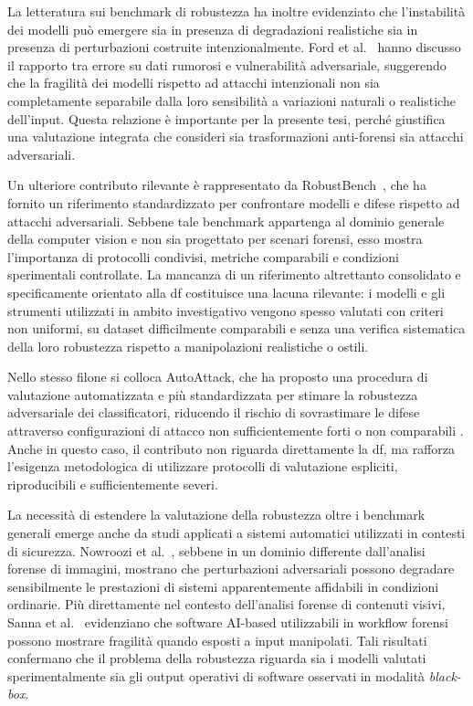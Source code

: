 La letteratura sui benchmark di robustezza ha inoltre evidenziato che l'instabilità dei modelli può emergere sia in presenza di degradazioni realistiche sia in presenza di perturbazioni costruite intenzionalmente. Ford et al.~\cite{ford2019adversarial} hanno discusso il rapporto tra errore su dati rumorosi e vulnerabilità adversariale, suggerendo che la fragilità dei modelli rispetto ad attacchi intenzionali non sia completamente separabile dalla loro sensibilità a variazioni naturali o realistiche dell'input. Questa relazione è importante per la presente tesi, perché giustifica una valutazione integrata che consideri sia trasformazioni anti-forensi sia attacchi adversariali.

Un ulteriore contributo rilevante è rappresentato da RobustBench~\cite{croce2020robustbench}, che ha fornito un riferimento standardizzato per confrontare modelli e difese rispetto ad attacchi adversariali. Sebbene tale benchmark appartenga al dominio generale della computer vision e non sia progettato per scenari forensi, esso mostra l'importanza di protocolli condivisi, metriche comparabili e condizioni sperimentali controllate. La mancanza di un riferimento altrettanto consolidato e specificamente orientato alla \gls{df} costituisce una lacuna rilevante: i modelli e gli strumenti utilizzati in ambito investigativo vengono spesso valutati con criteri non uniformi, su dataset difficilmente comparabili e senza una verifica sistematica della loro robustezza rispetto a manipolazioni realistiche o ostili.

Nello stesso filone si colloca AutoAttack, che ha proposto una procedura di valutazione automatizzata e più standardizzata per stimare la robustezza adversariale dei classificatori, riducendo il rischio di sovrastimare le difese attraverso configurazioni di attacco non sufficientemente forti o non comparabili \cite{croce2020autoattack}. Anche in questo caso, il contributo non riguarda direttamente la \gls{df}, ma rafforza l'esigenza metodologica di utilizzare protocolli di valutazione espliciti, riproducibili e sufficientemente severi.

La necessità di estendere la valutazione della robustezza oltre i benchmark generali emerge anche da studi applicati a sistemi automatici utilizzati in contesti di sicurezza. Nowroozi et al.~\cite{nowroozi2024verifying}, sebbene in un dominio differente dall'analisi forense di immagini, mostrano che perturbazioni adversariali possono degradare sensibilmente le prestazioni di sistemi apparentemente affidabili in condizioni ordinarie. Più direttamente nel contesto dell'analisi forense di contenuti visivi, Sanna et al.~\cite{sanna2024preliminary,sanna2025pixelperfect} evidenziano che software AI-based utilizzabili in workflow forensi possono mostrare fragilità quando esposti a input manipolati. Tali risultati confermano che il problema della robustezza riguarda sia i modelli valutati sperimentalmente sia gli output operativi di software osservati in modalità \textit{black-box}.

